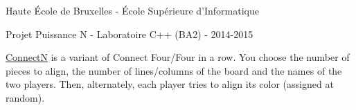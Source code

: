 Haute École de Bruxelles -\/ École Supérieure d'Informatique

Projet Puissance N -\/ Laboratoire C++ (B\+A2) -\/ 2014-\/2015

\hyperlink{classConnectN}{Connect\+N} is a variant of Connect Four/\+Four in a row. You choose the number of pieces to align, the number of lines/columns of the board and the names of the two players. Then, alternately, each player tries to align its color (assigned at random). 
